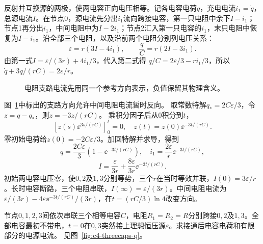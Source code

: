 \begin{solution}
反射并互换源的两极，使两电容正向电压相等。记各电容电荷$q$，充电电流$i_1=\dot q$，总源电流$I$。在节点0，源电流先分出$i_1$流向跨接电容，第一只电阻中余下$I-i_1$；节点1再分出$i_1$，中间电阻中为$I-2i_1$；节点2汇入第一只电容的$i_1$，末只电阻中恢复为$I-i_1$。沿全部三个电阻，以及沿前两个电阻分别列电压关系：
\[
 \varepsilon=r(3I-4i_1),\qquad \frac qC=r(2I-3i_1).
\]
由第一式$I=\varepsilon/(3r)+4i_1/3$，代入第二式得
$q/C=2\varepsilon/3-ri_1/3$，所以
$\dot q+3q/(rC)=2\varepsilon/r$。

\begin{figure}[H]\centering
{}
\caption{电阻支路电流先用同一个参考方向表示，负值保留其物理含义。}\label{fig:c4-bridge-s}
\end{figure}

图~\ref{fig:c4-bridge-s}中标出的支路方向允许中间电阻电流暂时反向。
取常数特解$q_*=2C\varepsilon/3$，令$z=q-q_*$，则$\dot z=-3z/(rC)$。
乘积分因子后从$0$积分到$t$，
\[
 [z(s)\ee^{3s/(rC)}]_0^t=0,
 \quad z(t)=z(0)\ee^{-3t/(rC)}.
\]
零初始电荷给$z(0)=-2C\varepsilon/3$。加回特解并求导，得到
\[
 \boxed{q=\frac{2C\varepsilon}3(1-\ee^{-3t/(rC)})},\quad
 i_1=\frac{2\varepsilon}r\ee^{-3t/(rC)},
\]
\[
 \boxed{I=\frac{\varepsilon}{3r}+
 \frac{8\varepsilon}{3r}\ee^{-3t/(rC)}}.
\]
初始两电容电压零，使$0,2$及$1,3$分别等势，三个$r$在当时等效并联，$I(0)=3\varepsilon/r$。长时电容断路，三个电阻串联，$I(\infty)=\varepsilon/(3r)$。中间电阻电流为
$\varepsilon/(3r)-4\varepsilon\ee^{-3t/(rC)}/(3r)$，在$t=(rC/3)\ln4$改变方向。
\end{solution}

\begin{example}[三串联电容与交叉电阻的两阶段过程]\label{ex:c4-threecaps}
节点$0,1,2,3$间依次串联三个相等电容$C$，电阻$R_1=R_2=R$分别跨接$0,2$及$1,3$。全部电容最初不带电，$t=0$在$0,3$突然接上理想恒压源$\varepsilon$。求接通后电容电荷和有限部分的电源电流。 见图~\ref{fig:c4-threecaps-q}。
\end{example}

